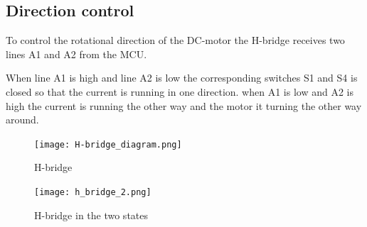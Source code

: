 \begin{figure}[!h]
	\centering
\end{figure}

\newpage
\subsection{Direction control} 
To control the rotational direction of the DC-motor the H-bridge receives two lines A1 and A2 from the MCU.

When line A1 is high and line A2 is low the corresponding switches S1 and S4 is closed so that the current is running in one direction. when A1 is low and A2 is high the current is running the other way and the motor it turning the other way around. \\
  \begin{figure}[!h!]
	\centering
	\texttt{[image: H-bridge\_diagram.png]}
	\caption{H-bridge}
	\label{fig:3}
\end{figure}


  \begin{figure}[!h!]
	\centering
	\texttt{[image: h\_bridge\_2.png]}
	\caption{H-bridge in the two states}
	\label{fig:3}
\end{figure}


